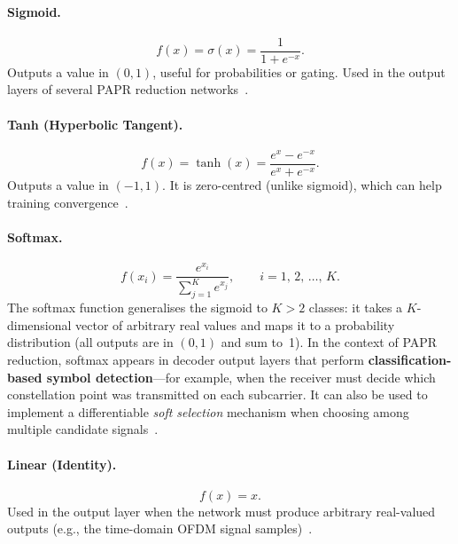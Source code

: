 \paragraph{Sigmoid.}
\begin{equation}
    f(x) = \sigma(x) = \frac{1}{1 + e^{-x}}.
    \label{eq:sigmoid}
\end{equation}
Outputs a value in $(0,1)$, useful for probabilities or gating.
Used in the output layers of several PAPR reduction
networks~\cite{kim2017novel,zou2021novel}.

\paragraph{Tanh (Hyperbolic Tangent).}
\begin{equation}
    f(x) = \tanh(x) = \frac{e^{x} - e^{-x}}{e^{x} + e^{-x}}.
    \label{eq:tanh}
\end{equation}
Outputs a value in $(-1,1)$.  It is zero-centred (unlike sigmoid),
which can help training convergence~\cite{da2024survey}.

\paragraph{Softmax.}
\begin{equation}
    f(x_i) = \frac{e^{x_i}}{\displaystyle\sum_{j=1}^{K} e^{x_j}},
    \qquad i = 1,\,2,\,\dots,\,K.
    \label{eq:softmax}
\end{equation}
The softmax function generalises the sigmoid to $K > 2$ classes: it takes a
$K$-dimensional vector of arbitrary real values and maps it to a probability
distribution (all outputs are in $(0,1)$ and sum to~1).  In the context of
PAPR reduction, softmax appears in decoder output layers that perform
\textbf{classification-based symbol detection}---for example, when the
receiver must decide which constellation point was transmitted on each
subcarrier.  It can also be used to implement a differentiable
\emph{soft selection} mechanism when choosing among multiple candidate
signals~\cite{da2024survey}.

\paragraph{Linear (Identity).}
\begin{equation}
    f(x) = x.
    \label{eq:linear_activation}
\end{equation}
Used in the output layer when the network must produce
arbitrary real-valued outputs (e.g., the time-domain OFDM signal
samples)~\cite{kim2017novel,nguyen2022deep}.


